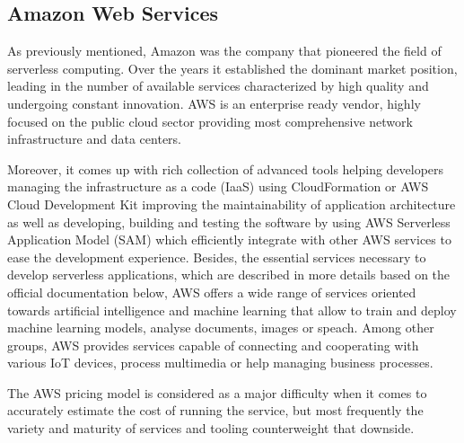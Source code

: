 \subsection{Amazon Web Services}

As previously mentioned, Amazon was the company that pioneered the field of serverless computing. Over the years it established the dominant market position, leading in the number of available services characterized by high quality and undergoing constant innovation. AWS is an enterprise ready vendor, highly focused on the public cloud sector providing most comprehensive network infrastructure and data centers.

Moreover, it comes up with rich collection of advanced tools helping developers managing the infrastructure as a code (IaaS) using CloudFormation or AWS Cloud Development Kit improving the maintainability of application architecture as well as developing, building and testing the software by using AWS Serverless Application Model (SAM) which efficiently integrate with other AWS services to ease the development experience. Besides, the essential services necessary to develop serverless applications, which are described in more details based on the official documentation \cite{AWSServerlessOffering} below, AWS offers a wide range of services oriented towards artificial intelligence and machine learning that allow to train and deploy machine learning models, analyse documents, images or speach. Among other groups, AWS provides services capable of connecting and cooperating with various IoT devices, process multimedia or help managing business processes.

The AWS pricing model is considered as a major difficulty when it comes to accurately estimate the cost of running the service, but most frequently the variety and maturity of services and tooling counterweight that downside.


